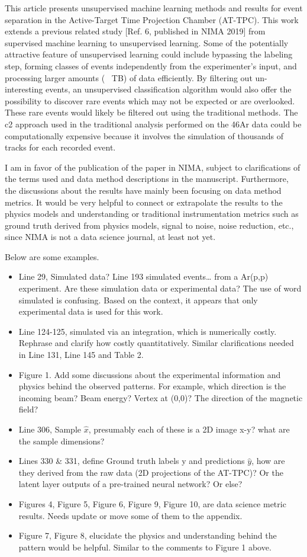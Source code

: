 \documentclass[12pt]{article}
\begin{document}
This article presents unsupervised machine learning methods and results for event separation in
the Active-Target Time Projection Chamber (AT-TPC). This work extends a previous related
study [Ref. 6, published in NIMA 2019] from supervised machine learning to unsupervised
learning. Some of the potentially attractive feature of unsupervised learning could include
bypassing the labeling step, forming classes of events independently from the experimenter’s input,
and processing larger amounts (~ TB) of data efficiently. By filtering out un-interesting events, an
unsupervised classification algorithm would also offer the possibility to discover rare events which
may not be expected or are overlooked. These rare events would likely be filtered out using the
traditional methods. The c2 approach used in the traditional analysis performed on the 46Ar data
could be computationally expensive because it involves the simulation of thousands of tracks for
each recorded event.


I am in favor of the publication of the paper in NIMA, subject to clarifications of the terms used
and data method descriptions in the manuscript. Furthermore, the discussions about the results
have mainly been focusing on data method metrics. It would be very helpful to connect or
extrapolate the results to the physics models and understanding or traditional instrumentation
metrics such as ground truth derived from physics models, signal to noise, noise reduction, etc.,
since NIMA is not a data science journal, at least not yet.


Below are some examples.
\begin{itemize}
\item Line 29, Simulated data? Line 193 simulated events… from a Ar(p,p) experiment. Are these
simulation data or experimental data? The use of word simulated is confusing. Based on the context,
it appears that only experimental data is used for this work.
\item Line 124-125, simulated via an integration, which is numerically costly. Rephrase and clarify how
costly quantitatively. Similar clarifications needed in Line 131, Line 145 and Table 2.
\item Figure 1. Add some discussions about the experimental information and physics behind the
observed patterns. For example, which direction is the incoming beam? Beam energy? Vertex at
(0,0)? The direction of the magnetic field?
\item Line 306, Sample $\hat{x}$, presumably each of these is a 2D image x-y? what are the sample
dimensions?
\item Lines 330 \& 331, define Ground truth labels y and predictions $\hat{y}$, how are they derived from
the raw data (2D projections of the AT-TPC)? Or the latent layer outputs of a pre-trained neural
network? Or else?
\item Figures 4, Figure 5, Figure 6, Figure 9, Figure 10, are data science metric results. Needs update or
move some of them to the appendix.
\item Figure 7, Figure 8, elucidate the physics and understanding behind the pattern would be helpful.
Similar to the comments to Figure 1 above.
\end{itemize}
\end{document}
